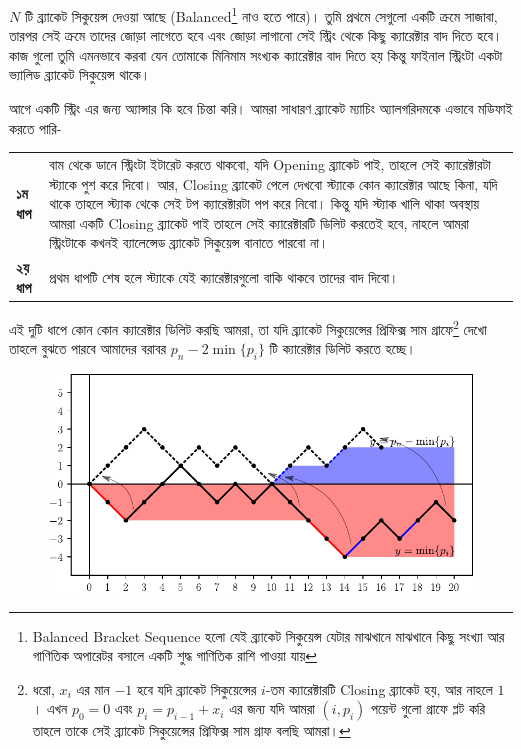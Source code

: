 \begin{example}
$N$ টি ব্র্যাকেট সিকুয়েন্স দেওয়া আছে (Balanced\footnote{Balanced Bracket Sequence হলো যেই ব্র্যাকেট সিকুয়েন্স যেটার মাঝখানে মাঝখানে কিছু সংখ্যা আর গাণিতিক অপারেটর বসালে একটি শুদ্ধ গাণিতিক রাশি পাওয়া যায়} নাও হতে পারে)। তুমি প্রথমে সেগুলো একটি ক্রমে সাজাবা, তারপর সেই ক্রমে তাদের জোড়া  লাগেতে হবে এবং জোড়া লাগানো সেই স্ট্রিং থেকে কিছু ক্যারেক্টার বাদ দিতে হবে। কাজ গুলো তুমি এমনভাবে করবা যেন তোমাকে মিনিমাম সংখ্যক ক্যারেক্টার বাদ দিতে হয় কিন্তু ফাইনাল স্ট্রিংটা একটা ভ্যালিড ব্র্যাকেট সিকুয়েন্স থাকে।
\end{example}
\begin{solution}
আগে একটি স্ট্রিং এর জন্য অ্যান্সার কি হবে চিন্তা করি। আমরা সাধারণ ব্র্যাকেট ম্যাচিং অ্যালগরিদমকে এভাবে মডিফাই করতে পারি-
\begin{center}
  \begin{tabularx}{\textwidth}{l X}
    \textbf{১ম ধাপ} & বাম থেকে ডানে স্ট্রিংটা ইটারেট করতে থাকবো, যদি Opening ব্র্যাকেট পাই, তাহলে সেই ক্যারেক্টারটা স্ট্যাকে পুশ করে দিবো। আর, Closing ব্র্যাকেট পেলে দেখবো স্ট্যাকে কোন ক্যারেক্টার আছে কিনা, যদি থাকে তাহলে স্ট্যাক থেকে সেই টপ ক্যারেক্টারটা পপ করে নিবো। কিন্তু যদি স্ট্যাক খালি থাকা অবস্থায় আমরা একটি Closing ব্র্যাকেট পাই তাহলে সেই ক্যারেক্টারটি ডিলিট করতেই হবে, নাহলে আমরা স্ট্রিংটাকে কখনই ব্যালেন্সেড ব্র্যাকেট সিকুয়েন্স বানাতে পারবো না।\\
    \textbf{২য় ধাপ} & প্রথম ধাপটি শেষ হলে স্ট্যাকে যেই ক্যারেক্টারগুলো বাকি থাকবে তাদের বাদ দিবো।
  \end{tabularx} 
\end{center}
এই দুটি ধাপে কোন কোন ক্যারেক্টার ডিলিট করছি আমরা, তা যদি ব্র্যাকেট সিকুয়েন্সের প্রিফিক্স সাম গ্রাফে\footnote{ধরো, $x_i$ এর মান $-1$ হবে যদি ব্র্যাকেট সিকুয়েন্সের $i$-তম ক্যারেক্টারটি Closing ব্র্যাকেট হয়, আর নাহলে $1$। এখন $p_0 = 0$ এবং $p_i = p_{i-1} + x_i$ এর জন্য যদি আমরা $(i, p_i)$ পয়েন্ট গুলো গ্রাফে প্লট করি তাহলে তাকে সেই ব্র্যাকেট সিকুয়েন্সের প্রিফিক্স সাম গ্রাফ বলছি আমরা।} দেখো তাহলে বুঝতে পারবে আমাদের বরাবর $p_n - 2\min\{p_i\}$ টি ক্যারেক্টার ডিলিট করতে হচ্ছে।
\begin{figure}[h]
  \centering
  \includegraphics[width = \linewidth]{./img/exchange-arg/bracket-sequence/final.pdf}

\end{figure}
\end{solution}
